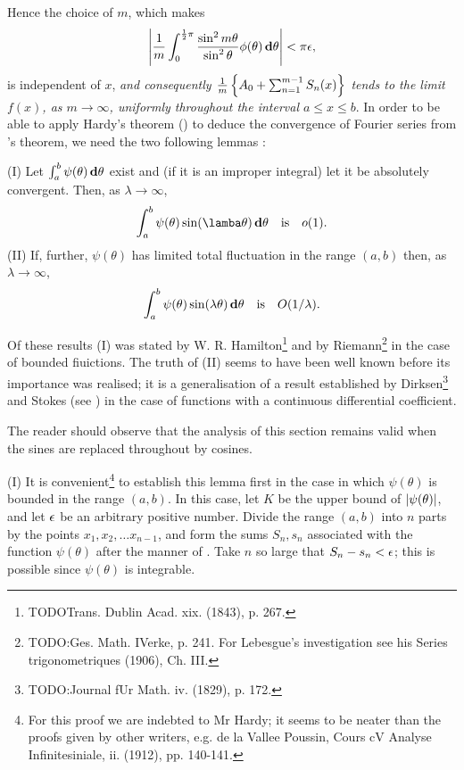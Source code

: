 Hence the choice of $m$, which makes
$$
\left| 
  \frac{1}{m}
  \int_{0}^{\frac{1}{2} \pi}
  \frac{\sin^{2} m \theta}{\sin^{2} \theta}
  \phi(\theta)
  \, \mathbf{d} \theta
 \right|
<
\pi \epsilon,
$$
is independent of $x$, \emph{and consequently
  $\frac{1}{m}\left\{ 
    A_{0} + \sum_{n=1}^{m-1} S_{n}(x)
   \right\}$ tends to the limit $f(x)$, as $m \rightarrow \infty$,
  uniformly throughout the interval $a \leq x \leq b$}.
In order to be able to apply Hardy's theorem () to deduce the
convergence of Fourier series from \Fejer's theorem, we need the two
following lemmas :

(I) Let $\int_{a}^{b} \psi(\theta) \, \mathbf{d} \theta$ exist and (if it is an improper integral) let it be
absolutely convergent. Then, as $\lambda \rightarrow \infty$,
$$
\int_{a}^{b} \psi(\theta) \sin (\lamba \theta) \dmeasure \theta
\quad
\textrm{is}
\quad
\littleo(1).
$$
(II) If, further, $\psi(\theta)$ has limited total fluctuation in the range
$(a,b)$ then, as $\lambda \rightarrow \infty$,
$$
\int_{a}^{b} \psi(\theta) \sin (\lambda\theta) \, \mathbf{d} \theta
\quad
\textrm{is}
\quad
O(1 / \lambda).
$$

%
%

Of these results (I) %
was stated by W. R. Hamilton\footnote{TODOTrans. Dublin Acad. xix. (1843), p. 267.} and by
Riemann\footnote{TODO:Ges. Math. IVerke, p. 241. For Lebesgue's investigation see his
Series trigonometriques (1906), Ch. III.} in
the case of bounded fiuictions.
The truth of (II) %
seems to have been
well known before its importance was realised; it is a generalisation
of a result established by Dirksen\footnote{TODO:Journal fUr Math. iv. (1829), p. 172.}
and Stokes (see ) in the
case of functions with a continuous differential coefficient.

The reader should observe that the analysis of this section remains
valid when the sines are replaced throughout by cosines.

(I) It is convenient\footnote{For this proof we are indebted to Mr Hardy;
  it seems to be neater than the proofs given by other writers,
  e.g. de la Vallee Poussin,
  Cours cV Analyse Infinitesiniale, ii. (1912), pp. 140-141.}
to establish this lemma first in the case in
which $\psi(\theta)$ is bounded in the range $(a, b)$. In this case, let $K$ be
the upper bound of $\left| \psi(\theta) \right|$, and let $\epsilon$ be an arbitrary positive
number. Divide the range $(a, b)$ into $n$ parts by the points
$x_{1}, x_{2}, \ldots x_{n-1}$, and form the sums $S_{n}, s_{n}$ associated with the function
$\psi(\theta)$ after the manner of . Take $n$ so large that
$S_{n} - s_{n} < \epsilon$; this is
possible since $\psi(\theta)$ is integrable.

